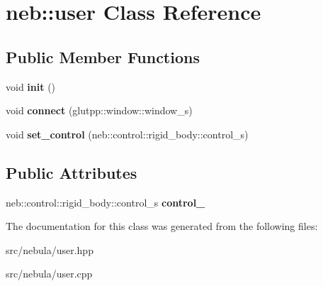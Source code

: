 \hypertarget{classneb_1_1user}{
\section{neb::user Class Reference}
\label{classneb_1_1user}
}
\subsection*{Public Member Functions}
\begin{DoxyCompactItemize}
\item 
\hypertarget{classneb_1_1user_a03537b4a3dbb21efa368fcf846384dd5}{
void {\bfseries init} ()}
\label{classneb_1_1user_a03537b4a3dbb21efa368fcf846384dd5}

\item 
\hypertarget{classneb_1_1user_a4bbd0003c3ba2ef7f25579784cbcb6f5}{
void {\bfseries connect} (glutpp::window::window\_\-s)}
\label{classneb_1_1user_a4bbd0003c3ba2ef7f25579784cbcb6f5}

\item 
\hypertarget{classneb_1_1user_ae6295dcc8ac8e664cedc8591c28257d0}{
void {\bfseries set\_\-control} (neb::control::rigid\_\-body::control\_\-s)}
\label{classneb_1_1user_ae6295dcc8ac8e664cedc8591c28257d0}

\end{DoxyCompactItemize}
\subsection*{Public Attributes}
\begin{DoxyCompactItemize}
\item 
\hypertarget{classneb_1_1user_a66992175b55bcc61803d87d19f1327f8}{
neb::control::rigid\_\-body::control\_\-s {\bfseries control\_\-}}
\label{classneb_1_1user_a66992175b55bcc61803d87d19f1327f8}

\end{DoxyCompactItemize}


The documentation for this class was generated from the following files:\begin{DoxyCompactItemize}
\item 
src/nebula/user.hpp\item 
src/nebula/user.cpp\end{DoxyCompactItemize}
